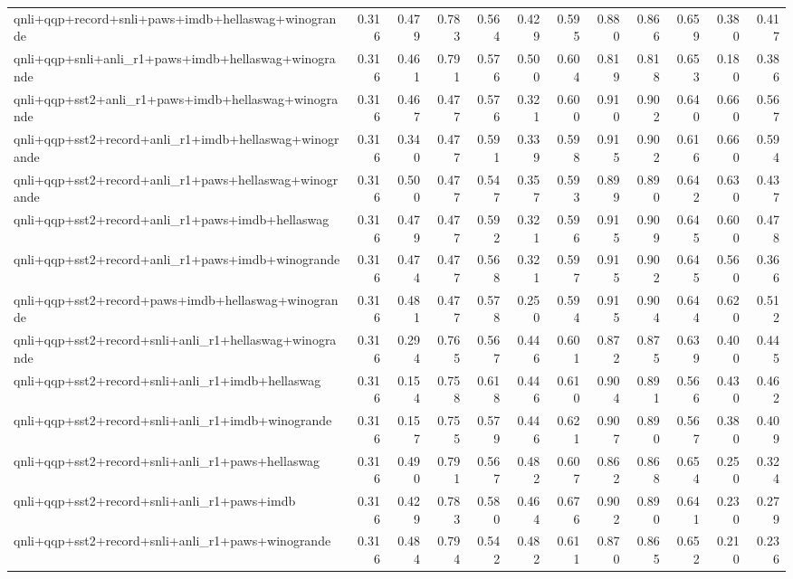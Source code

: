\begin{table}[t]
\begin{tabular}{lrrrrrrrrrrr}
    qnli+qqp+record+snli+paws+imdb+hellaswag+winogrande & 0.316 & 0.479 & 0.783 & 0.564 & 0.429 & 0.595 & 0.880 & 0.866 & 0.659 & 0.380 & 0.417 \\
    qnli+qqp+snli+anli\_r1+paws+imdb+hellaswag+winogrande & 0.316 & 0.461 & 0.791 & 0.576 & 0.500 & 0.604 & 0.819 & 0.818 & 0.653 & 0.180 & 0.386 \\
    qnli+qqp+sst2+anli\_r1+paws+imdb+hellaswag+winogrande & 0.316 & 0.467 & 0.477 & 0.576 & 0.321 & 0.600 & 0.910 & 0.902 & 0.640 & 0.660 & 0.567 \\
    qnli+qqp+sst2+record+anli\_r1+imdb+hellaswag+winogrande & 0.316 & 0.340 & 0.477 & 0.591 & 0.339 & 0.598 & 0.915 & 0.902 & 0.616 & 0.660 & 0.594 \\
    qnli+qqp+sst2+record+anli\_r1+paws+hellaswag+winogrande & 0.316 & 0.500 & 0.477 & 0.547 & 0.357 & 0.593 & 0.899 & 0.890 & 0.642 & 0.630 & 0.437 \\
    qnli+qqp+sst2+record+anli\_r1+paws+imdb+hellaswag & 0.316 & 0.479 & 0.477 & 0.592 & 0.321 & 0.596 & 0.915 & 0.909 & 0.645 & 0.600 & 0.478 \\
    qnli+qqp+sst2+record+anli\_r1+paws+imdb+winogrande & 0.316 & 0.474 & 0.477 & 0.568 & 0.321 & 0.597 & 0.915 & 0.902 & 0.645 & 0.560 & 0.366 \\
    qnli+qqp+sst2+record+paws+imdb+hellaswag+winogrande & 0.316 & 0.481 & 0.477 & 0.578 & 0.250 & 0.594 & 0.915 & 0.904 & 0.644 & 0.620 & 0.512 \\
    qnli+qqp+sst2+record+snli+anli\_r1+hellaswag+winogrande & 0.316 & 0.294 & 0.765 & 0.567 & 0.446 & 0.601 & 0.872 & 0.875 & 0.639 & 0.400 & 0.445 \\
    qnli+qqp+sst2+record+snli+anli\_r1+imdb+hellaswag & 0.316 & 0.154 & 0.758 & 0.618 & 0.446 & 0.610 & 0.904 & 0.891 & 0.566 & 0.430 & 0.462 \\
    qnli+qqp+sst2+record+snli+anli\_r1+imdb+winogrande & 0.316 & 0.157 & 0.755 & 0.579 & 0.446 & 0.621 & 0.907 & 0.890 & 0.567 & 0.380 & 0.409 \\
    qnli+qqp+sst2+record+snli+anli\_r1+paws+hellaswag & 0.316 & 0.490 & 0.791 & 0.567 & 0.482 & 0.607 & 0.862 & 0.868 & 0.654 & 0.250 & 0.324 \\
    qnli+qqp+sst2+record+snli+anli\_r1+paws+imdb & 0.316 & 0.429 & 0.783 & 0.580 & 0.464 & 0.676 & 0.902 & 0.890 & 0.641 & 0.230 & 0.279 \\
    qnli+qqp+sst2+record+snli+anli\_r1+paws+winogrande & 0.316 & 0.484 & 0.794 & 0.542 & 0.482 & 0.611 & 0.870 & 0.865 & 0.652 & 0.210 & 0.236 \\

\end{tabular}
\end{table}
